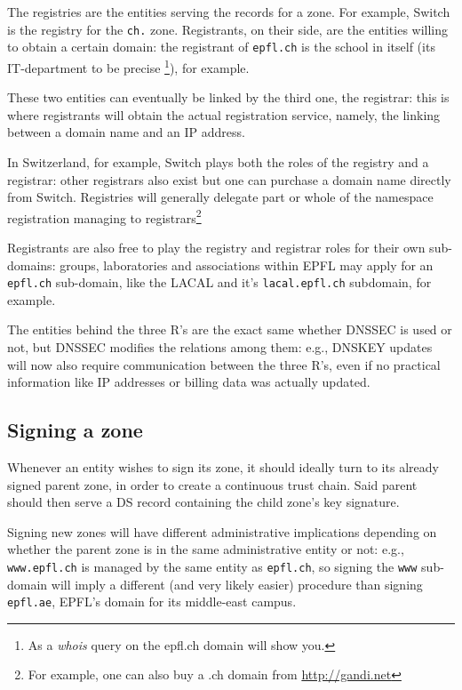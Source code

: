\documentclass[a4paper,twocolumn]{scrartcl}
\begin{document}
The registries are the entities serving the records for a zone. For example, Switch is the registry for the \verb|ch.| zone. Registrants, on their side, are the entities willing to obtain a certain domain: the registrant of \verb|epfl.ch| is the school in itself (its IT-department to be precise \footnote{As a \emph{whois} query on the epfl.ch domain will show you.}), for example.

These two entities can eventually be linked by the third one, the registrar: this is where registrants will obtain the actual registration service, namely, the linking between a domain name and an IP address.

In Switzerland, for example, Switch plays both the roles of the registry and a registrar: other registrars also exist but one can purchase a domain name directly from Switch. Registries will generally delegate part or whole of the namespace registration managing to registrars\footnote{For example, one can also buy a .ch domain from \url{http://gandi.net}}

Registrants are also free to play the registry and registrar roles for their own sub-domains: groups, laboratories and associations within EPFL may apply for an \verb|epfl.ch| sub-domain, like the LACAL and it's \verb|lacal.epfl.ch| subdomain, for example.

The entities behind the three R's are the exact same whether DNSSEC is used or not, but DNSSEC modifies the relations among them: e.g., DNSKEY updates will now also require communication between the three R's, even if no practical information like IP addresses or billing data was actually updated.

\subsection{Signing a zone}
Whenever an entity wishes to sign its zone, it should ideally turn to its already signed parent zone, in order to create a continuous trust chain.
Said parent should then serve a DS record containing the child zone's key signature.

Signing new zones will have different administrative implications depending on whether the parent zone is in the same administrative entity or not: e.g., \verb|www.epfl.ch| is managed by the same entity as \verb|epfl.ch|, so signing the \verb|www| sub-domain will imply a different (and very likely easier) procedure than signing \verb|epfl.ae|, EPFL's domain for its middle-east campus.
\end{document}
